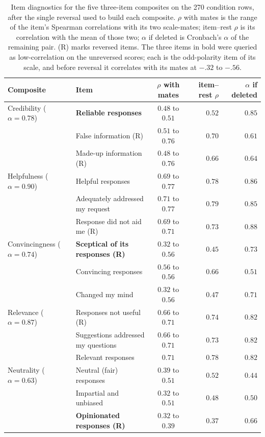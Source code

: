 \begin{table}[H]
\centering
\small
\caption{Item diagnostics for the five three-item composites on the 270 condition rows, after the single reversal used to build each composite. \(\rho\) with mates is the range of the item's Spearman correlations with its two scale-mates; item--rest \(\rho\) is its correlation with the mean of those two; \(\alpha\) if deleted is Cronbach's \(\alpha\) of the remaining pair. (R) marks reversed items. The three items in bold were queried as low-correlation on the unreversed scores; each is the odd-polarity item of its scale, and before reversal it correlates with its mates at \(-.32\) to \(-.56\).}
\label{tab:beh-item-diag}
\setlength{\tabcolsep}{4pt}
\begin{tabular}{@{}ll c r r@{}}
\toprule
Composite & Item & \(\rho\) with mates & item--rest \(\rho\) & \(\alpha\) if deleted \\
\midrule
Credibility (\(\alpha=0.78\)) & \textbf{Reliable responses} & $0.48$ to $0.51$ & $0.52$ & $0.85$ \\
 & False information (R) & $0.51$ to $0.76$ & $0.70$ & $0.61$ \\
 & Made-up information (R) & $0.48$ to $0.76$ & $0.66$ & $0.64$ \\
\addlinespace[2pt]
Helpfulness (\(\alpha=0.90\)) & Helpful responses & $0.69$ to $0.77$ & $0.78$ & $0.86$ \\
 & Adequately addressed my request & $0.71$ to $0.77$ & $0.79$ & $0.85$ \\
 & Response did not aid me (R) & $0.69$ to $0.71$ & $0.73$ & $0.88$ \\
\addlinespace[2pt]
Convincingness (\(\alpha=0.74\)) & \textbf{Sceptical of its responses (R)} & $0.32$ to $0.56$ & $0.45$ & $0.73$ \\
 & Convincing responses & $0.56$ to $0.56$ & $0.66$ & $0.51$ \\
 & Changed my mind & $0.32$ to $0.56$ & $0.47$ & $0.71$ \\
\addlinespace[2pt]
Relevance (\(\alpha=0.87\)) & Responses not useful (R) & $0.66$ to $0.71$ & $0.74$ & $0.82$ \\
 & Suggestions addressed my questions & $0.66$ to $0.71$ & $0.73$ & $0.82$ \\
 & Relevant responses & $0.71$ & $0.78$ & $0.82$ \\
\addlinespace[2pt]
Neutrality (\(\alpha=0.63\)) & Neutral (fair) responses & $0.39$ to $0.51$ & $0.52$ & $0.44$ \\
 & Impartial and unbiased & $0.32$ to $0.51$ & $0.48$ & $0.50$ \\
 & \textbf{Opinionated responses (R)} & $0.32$ to $0.39$ & $0.37$ & $0.66$ \\
\bottomrule
\end{tabular}
\end{table}
